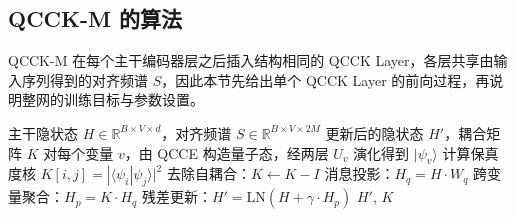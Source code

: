 \subsection{QCCK-M 的算法}

QCCK-M 在每个主干编码器层之后插入结构相同的 QCCK Layer，各层共享由输入序列得到的对齐频谱 $S$，因此本节先给出单个 QCCK Layer 的前向过程，再说明整网的训练目标与参数设置。

\begin{algorithm}[htbp]
\caption{QCCK Layer 前向传播}
\label{alg:qcck-layer-zh}
\begin{algorithmic}[1]
\REQUIRE 主干隐状态 $H\in\mathbb{R}^{B\times V\times d}$，对齐频谱 $S\in\mathbb{R}^{B\times V\times 2M}$
\ENSURE 更新后的隐状态 $H'$，耦合矩阵 $K$
\STATE 对每个变量 $v$，由 QCCE 构造量子态，经两层 $U_v$ 演化得到 $|\psi_v\rangle$
\STATE 计算保真度核 $K[i,j] = |\langle\psi_i|\psi_j\rangle|^2$
\STATE 去除自耦合：$K \leftarrow K - I$
\STATE 消息投影：$H_q = H \cdot W_q$
\STATE 跨变量聚合：$H_p = K \cdot H_q$
\STATE 残差更新：$H' = \mathrm{LN}(H + \gamma \cdot H_p)$
\RETURN $H'$, $K$
\end{algorithmic}
\end{algorithm}

